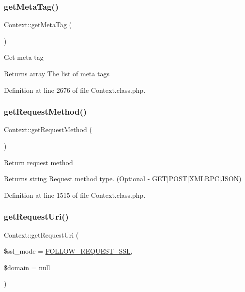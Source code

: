 \subsubsection{\texorpdfstring{get\+Meta\+Tag()}{getMetaTag()}}
{\footnotesize\ttfamily Context\+::get\+Meta\+Tag (\begin{DoxyParamCaption}{ }\end{DoxyParamCaption})}

Get meta tag \begin{DoxyReturn}{Returns}
array The list of meta tags 
\end{DoxyReturn}


Definition at line 2676 of file Context.\+class.\+php.

\mbox{\label{classContext_a6912ff86e08ef782a296b77ff1307481}} 
\subsubsection{\texorpdfstring{get\+Request\+Method()}{getRequestMethod()}}
{\footnotesize\ttfamily Context\+::get\+Request\+Method (\begin{DoxyParamCaption}{ }\end{DoxyParamCaption})}

Return request method \begin{DoxyReturn}{Returns}
string Request method type. (Optional -\/ G\+E\+T$\vert$\+P\+O\+S\+T$\vert$\+X\+M\+L\+R\+P\+C$\vert$\+J\+S\+ON) 
\end{DoxyReturn}


Definition at line 1515 of file Context.\+class.\+php.

\mbox{\label{classContext_aa79578cfccee4d7f7c4890dc6e36ff90}} 
\subsubsection{\texorpdfstring{get\+Request\+Uri()}{getRequestUri()}}
{\footnotesize\ttfamily Context\+::get\+Request\+Uri (\begin{DoxyParamCaption}\item[{}]{\$ssl\+\_\+mode = {\ttfamily \hyperlink{Context_8class_8php_a546ef85538017b41b2928e818066989d}{F\+O\+L\+L\+O\+W\+\_\+\+R\+E\+Q\+U\+E\+S\+T\+\_\+\+S\+SL}},  }\item[{}]{\$domain = {\ttfamily null} }\end{DoxyParamCaption})}

